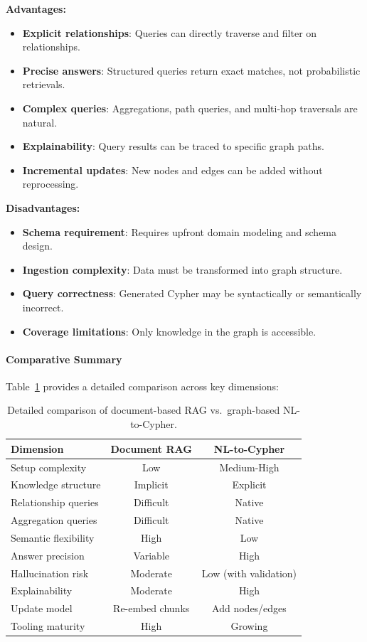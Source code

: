 \textbf{Advantages:}
\begin{itemize}
    \item \textbf{Explicit relationships}: Queries can directly traverse and filter on relationships.
    \item \textbf{Precise answers}: Structured queries return exact matches, not probabilistic retrievals.
    \item \textbf{Complex queries}: Aggregations, path queries, and multi-hop traversals are natural.
    \item \textbf{Explainability}: Query results can be traced to specific graph paths.
    \item \textbf{Incremental updates}: New nodes and edges can be added without reprocessing.
\end{itemize}

\textbf{Disadvantages:}
\begin{itemize}
    \item \textbf{Schema requirement}: Requires upfront domain modeling and schema design.
    \item \textbf{Ingestion complexity}: Data must be transformed into graph structure.
    \item \textbf{Query correctness}: Generated Cypher may be syntactically or semantically incorrect.
    \item \textbf{Coverage limitations}: Only knowledge in the graph is accessible.
\end{itemize}

\paragraph{Comparative Summary}

Table~\ref{tab:rag-vs-graph-detailed} provides a detailed comparison across key dimensions:

\begin{table}[ht]
\centering
\caption{Detailed comparison of document-based RAG vs.\ graph-based NL-to-Cypher.}
\label{tab:rag-vs-graph-detailed}
\small
\begin{tabular}{lcc}
\hline
\textbf{Dimension} & \textbf{Document RAG} & \textbf{NL-to-Cypher} \\
\hline
Setup complexity & Low & Medium-High \\
Knowledge structure & Implicit & Explicit \\
Relationship queries & Difficult & Native \\
Aggregation queries & Difficult & Native \\
Semantic flexibility & High & Low \\
Answer precision & Variable & High \\
Hallucination risk & Moderate & Low (with validation) \\
Explainability & Moderate & High \\
Update model & Re-embed chunks & Add nodes/edges \\
Tooling maturity & High & Growing \\
\hline
\end{tabular}
\end{table}

